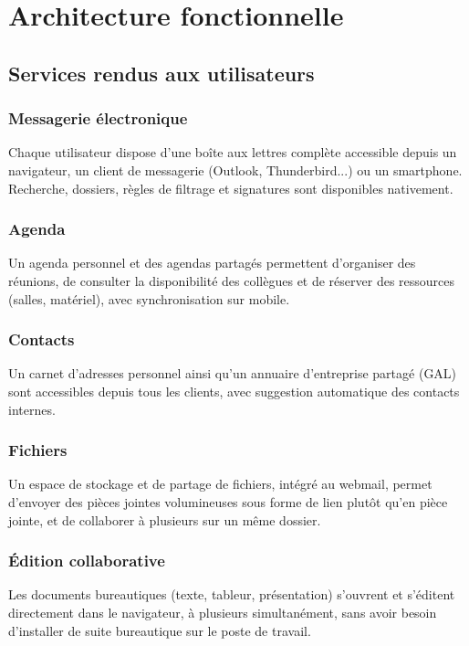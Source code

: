 \documentclass[11pt,a4paper]{report}
\begin{document}
\chapter{Architecture fonctionnelle}

\section{Services rendus aux utilisateurs}
\subsection{Messagerie électronique}
Chaque utilisateur dispose d'une boîte aux lettres complète accessible depuis un navigateur, un client de messagerie (Outlook, Thunderbird.\allowbreak{}.\allowbreak{}.\allowbreak{}) ou un smartphone.\allowbreak{} Recherche, dossiers, règles de filtrage et signatures sont disponibles nativement.\allowbreak{}

\subsection{Agenda}
Un agenda personnel et des agendas partagés permettent d'organiser des réunions, de consulter la disponibilité des collègues et de réserver des ressources (salles, matériel), avec synchronisation sur mobile.\allowbreak{}

\subsection{Contacts}
Un carnet d'adresses personnel ainsi qu'un annuaire d'entreprise partagé (GAL) sont accessibles depuis tous les clients, avec suggestion automatique des contacts internes.\allowbreak{}

\subsection{Fichiers}
Un espace de stockage et de partage de fichiers, intégré au webmail, permet d'envoyer des pièces jointes volumineuses sous forme de lien plutôt qu'en pièce jointe, et de collaborer à plusieurs sur un même dossier.\allowbreak{}

\subsection{Édition collaborative}
Les documents bureautiques (texte, tableur, présentation) s'ouvrent et s'éditent directement dans le navigateur, à plusieurs simultanément, sans avoir besoin d'installer de suite bureautique sur le poste de travail.\allowbreak{}
\end{document}
